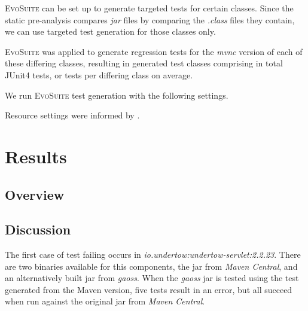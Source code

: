 \documentclass[conference]{IEEEtran}
\makeatletter
\newcommand{\evosuite}{\textsc{EvoSuite}\@\xspace}
\newcommand{\inputgen}[1]{\unskip}
\makeatother
\begin{document}
\evosuite can be set up to generate targeted tests for certain classes. Since the static pre-analysis compares \textit{jar} files by comparing the \textit{.class} files they contain, we can use targeted test generation for those classes only.   


\evosuite was applied to generate regression tests for the \textit{mvnc} version of each of these \inputgen{num-class-pairs-after-invokevirtual-invokeinterface} differing classes, resulting in \inputgen{num-classes-with-generated-tests} generated test classes comprising in total \inputgen{num-generated-tests} JUnit4 tests, or \inputgen{avg-tests-per-class} tests per differing class on average.

We run \evosuite test generation with the following settings. 



Resource settings were informed by \cite{jahangirova2023sbft}. 



\section{Results}

\subsection{Overview}


\subsection{Discussion}

The first case of test failing occurs in \textit{io.undertow:undertow-servlet:2.2.23}. There are two binaries available for this components, the jar from \textit{Maven Central}, and an alternatively built jar from \textit{gaoss}. When the  \textit{gaoss} jar is tested using the test generated from the Maven version, five tests result in an error, but all succeed when run against the original jar from \textit{Maven Central}.
\end{document}
